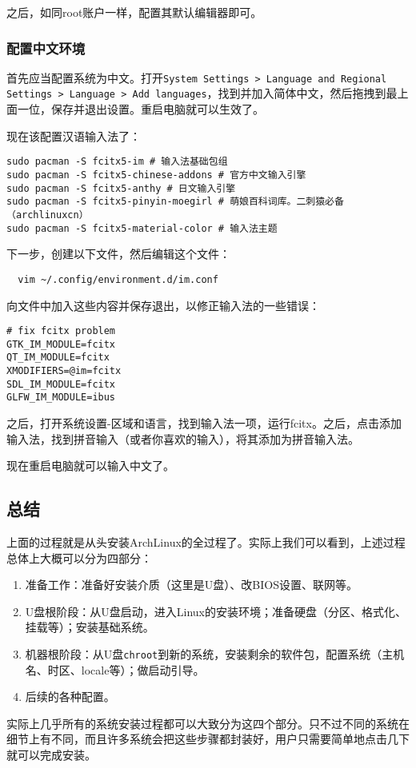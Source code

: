 之后，如同root账户一样，配置其默认编辑器即可。

\subsubsection{配置中文环境}

首先应当配置系统为中文。打开\texttt{System Settings > Language and Regional Settings > Language > Add languages}，找到并加入简体中文，然后拖拽到最上面一位，保存并退出设置。重启电脑就可以生效了。

现在该配置汉语输入法了：
\begin{lstlisting}
sudo pacman -S fcitx5-im # 输入法基础包组
sudo pacman -S fcitx5-chinese-addons # 官方中文输入引擎
sudo pacman -S fcitx5-anthy # 日文输入引擎
sudo pacman -S fcitx5-pinyin-moegirl # 萌娘百科词库。二刺猿必备（archlinuxcn）
sudo pacman -S fcitx5-material-color # 输入法主题
\end{lstlisting}
下一步，创建以下文件，然后编辑这个文件：
\begin{lstlisting}
  vim ~/.config/environment.d/im.conf
\end{lstlisting}
向文件中加入这些内容并保存退出，以修正输入法的一些错误：
\begin{lstlisting}
# fix fcitx problem
GTK_IM_MODULE=fcitx
QT_IM_MODULE=fcitx
XMODIFIERS=@im=fcitx
SDL_IM_MODULE=fcitx
GLFW_IM_MODULE=ibus
\end{lstlisting}
之后，打开系统设置-区域和语言，找到输入法一项，运行fcitx。之后，点击添加输入法，找到拼音输入（或者你喜欢的输入），将其添加为拼音输入法。

现在重启电脑就可以输入中文了。

\subsection{总结}

上面的过程就是从头安装ArchLinux的全过程了。实际上我们可以看到，上述过程总体上大概可以分为四部分：
\begin{enumerate}
  \item 准备工作：准备好安装介质（这里是U盘）、改BIOS设置、联网等。
  \item U盘根阶段：从U盘启动，进入Linux的安装环境；准备硬盘（分区、格式化、挂载等）；安装基础系统。
  \item 机器根阶段：从U盘\texttt{chroot}到新的系统，安装剩余的软件包，配置系统（主机名、时区、locale等）；做启动引导。
  \item 后续的各种配置。
\end{enumerate}
实际上几乎所有的系统安装过程都可以大致分为这四个部分。只不过不同的系统在细节上有不同，而且许多系统会把这些步骤都封装好，用户只需要简单地点击几下就可以完成安装。

